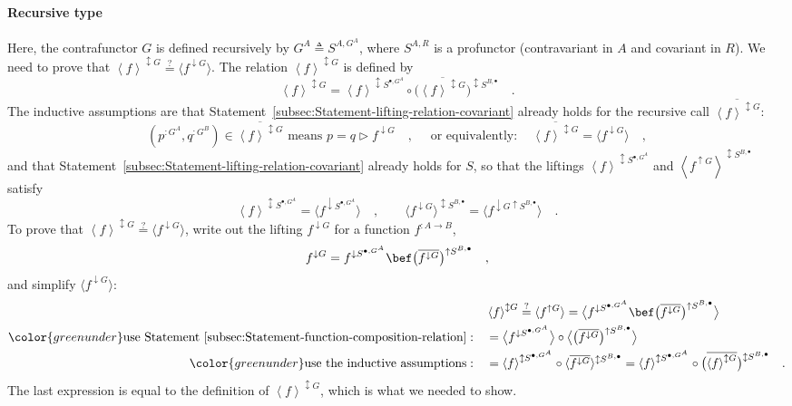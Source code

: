 \paragraph{Recursive type}

Here, the contrafunctor $G$ is defined recursively by $G^{A}\triangleq S^{A,G^{A}}$,
where $S^{A,R}$ is a profunctor (contravariant in $A$ and covariant
in $R$). We need to prove that $\left<f\right>^{\updownarrow G}\overset{?}{=}\langle f^{\downarrow G}\rangle$.
The relation $\left<f\right>^{\updownarrow G}$ is defined by
\[
\left<f\right>^{\updownarrow G}=\left<f\right>^{\updownarrow S^{\bullet,G^{A}}}\circ\big(\overline{\left<f\right>^{\updownarrow G}}\big)^{\updownarrow S^{B,\bullet}}\quad.
\]
The inductive assumptions are that Statement~\ref{subsec:Statement-lifting-relation-covariant}
already holds for the recursive call $\overline{\left<f\right>^{\updownarrow G}}$:
\[
(p^{:G^{A}},q^{:G^{B}})\in\overline{\left<f\right>^{\updownarrow G}}\text{ means }p=q\triangleright f^{\downarrow G}\quad,\quad\text{ or equivalently}:\quad\overline{\left<f\right>^{\updownarrow G}}=\langle f^{\downarrow G}\rangle\quad,
\]
and that Statement~\ref{subsec:Statement-lifting-relation-covariant}
already holds for $S$, so that the liftings $\left<f\right>^{\updownarrow S^{\bullet,G^{A}}}$
and $\left<f^{\uparrow G}\right>^{\updownarrow S^{B,\bullet}}$ satisfy
\[
\left<f\right>^{\updownarrow S^{\bullet,G^{A}}}=\langle f^{\downarrow S^{\bullet,G^{A}}}\rangle\quad,\quad\quad\langle f^{\downarrow G}\rangle^{\updownarrow S^{B,\bullet}}=\langle f^{\downarrow G\uparrow S^{B,\bullet}}\rangle\quad.
\]
To prove that $\left<f\right>^{\updownarrow G}\overset{?}{=}\langle f^{\downarrow G}\rangle$,
write out the lifting $f^{\downarrow G}$ for a function $f^{:A\rightarrow B}$,
\[
f^{\downarrow G}=f^{\downarrow S^{\bullet,G^{A}}}\bef\big(\overline{f^{\downarrow G}}\big)^{\uparrow S^{B,\bullet}}\quad,
\]
and simplify $\langle f^{\downarrow G}\rangle$:
\begin{align*}
 & \left<f\right>^{\updownarrow G}\overset{?}{=}\langle f^{\uparrow G}\rangle=\big\langle f^{\downarrow S^{\bullet,G^{A}}}\bef\big(\overline{f^{\downarrow G}}\big)^{\uparrow S^{B,\bullet}}\big\rangle\\
{\color{greenunder}\text{use Statement~\ref{subsec:Statement-function-composition-relation}}:}\quad & =\big\langle f^{\downarrow S^{\bullet,G^{A}}}\big\rangle\circ\big\langle\big(\overline{f^{\downarrow G}}\big)^{\uparrow S^{B,\bullet}}\big\rangle\\
{\color{greenunder}\text{use the inductive assumptions}:}\quad & =\left<f\right>^{\updownarrow S^{\bullet,G^{A}}}\circ\langle\overline{f^{\downarrow G}}\rangle^{\updownarrow S^{B,\bullet}}=\left<f\right>^{\updownarrow S^{\bullet,G^{A}}}\circ\big(\overline{\left<f\right>^{\updownarrow G}}\big)^{\updownarrow S^{B,\bullet}}\quad.
\end{align*}
The last expression is equal to the definition of $\left<f\right>^{\updownarrow G}$,
which is what we needed to show.

